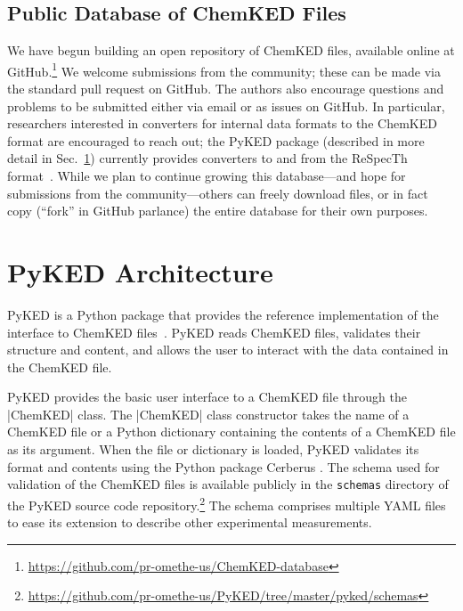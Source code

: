 \documentclass[12pt]{ijck}
\newcommand\ck{ChemKED}
\newcommand\pk{PyKED}
\begin{document}
\subsection{Public Database of \ck{} Files}\label{sec:public-database}

We have begun building an open repository of \ck{} files, available online at
GitHub.\footnote{\url{https://github.com/pr-omethe-us/ChemKED-database}}
We welcome submissions from the community; these can be made via the standard pull request
on GitHub. The authors also encourage questions and problems to be submitted either via
email or as issues on GitHub. In particular, researchers interested in converters for
internal data formats to the \ck{} format are encouraged to reach out;
the \pk{} package (described in more detail in Sec.~\ref{sec:pyked-architecture})
currently provides converters to and from the ReSpecTh format~\autocite{Varga2017}.
While we plan to continue growing this database---and hope for submissions from
the community---others can freely download files, or in fact copy (``fork'' in GitHub
parlance) the entire database for their own purposes.

\section{PyKED Architecture}\label{sec:pyked-architecture}
%
\pk{} is a Python package that provides the reference implementation
of the interface to \ck{} files~\autocite{PyKED}. \pk{} reads \ck{} files, validates
their structure and content, and allows the user to interact with the data contained
in the \ck{} file.

\pk{} provides the basic user interface to a \ck{} file through the
\pybox|ChemKED| class. The \pybox|ChemKED| class constructor takes the name
of a \ck{} file or a Python dictionary containing the contents of a \ck{} file
as its argument. When the file or dictionary is loaded, \pk{} validates its
format and contents using the Python package Cerberus \autocite{cerberus}. The
schema used for validation of the \ck{} files is available publicly in the
\texttt{schemas} directory of the PyKED source code
repository.\footnote{\url{https://github.com/pr-omethe-us/PyKED/tree/master/pyked/schemas}}
The schema comprises multiple YAML files to ease its extension to describe other
experimental measurements.
\end{document}

